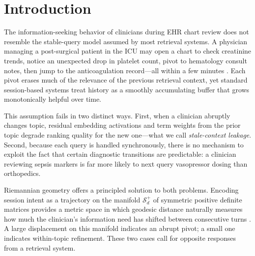 \documentclass[review]{elsarticle}
\begin{document}

\section{Introduction}
\label{sec:intro}

The information-seeking behavior of clinicians during EHR chart review does not
resemble the stable-query model assumed by most retrieval systems. A physician
managing a post-surgical patient in the ICU may open a chart to check creatinine
trends, notice an unexpected drop in platelet count, pivot to hematology consult
notes, then jump to the anticoagulation record---all within a few minutes
\cite{topol2019}. Each pivot erases much of the relevance of the previous
retrieval context, yet standard session-based systems treat history as a smoothly
accumulating buffer that grows monotonically helpful over time.

This assumption fails in two distinct ways. First, when a clinician abruptly
changes topic, residual embedding activations and term weights from the prior topic
degrade ranking quality for the new one---what we call \emph{stale-context
leakage}. Second, because each query is handled synchronously, there is no
mechanism to exploit the fact that certain diagnostic transitions are predictable:
a clinician reviewing sepsis markers is far more likely to next query vasopressor
dosing than orthopedics.

Riemannian geometry offers a principled solution to both problems. Encoding
session intent as a trajectory on the manifold $\mathcal{S}_d^+$ of symmetric
positive definite matrices provides a metric space in which geodesic distance
naturally measures how much the clinician's information need has shifted between
consecutive turns \cite{pennec2006_spd}. A large displacement on this manifold
indicates an abrupt pivot; a small one indicates within-topic refinement. These
two cases call for opposite responses from a retrieval system.
\end{document}
